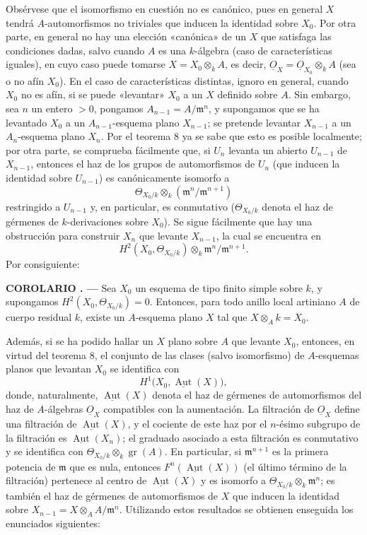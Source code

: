 \documentclass[11pt,twoside,openany]{book}
\numberwithin{equation}{section}
\newcommand{\Osh}{\underline{O}}
\theoremstyle{plain}
\theoremstyle{definition}
\theoremstyle{remark}
\newcommand{\result}[2]{%
  \par\medskip\noindent\textbf{#1%
  \if\relax\detokenize{#2}\relax\else\space#2\fi. ---}\enspace
}
\theoremstyle{plain}
\theoremstyle{definition}
\theoremstyle{remark}
\begin{document}
Obsérvese que el isomorfismo en cuestión no es canónico, pues en general $X$
tendrá $A$-automorfismos no triviales que inducen la identidad sobre $X_0$. Por
otra parte, en general no hay una elección «canónica» de un $X$ que satisfaga
las condiciones dadas, salvo cuando $A$ es una $k$-álgebra (caso de
características iguales), en cuyo caso puede tomarse $X=X_0\otimes_k A$, es
decir, $\Osh_X=\Osh_{X_0}\otimes_k A$ (sea o no afín $X_0$). En el caso de
características distintas, ignoro en general, cuando $X_0$ no es afín, si se
puede «levantar» $X_0$ a un $X$ definido sobre $A$. Sin embargo, sea $n$ un
entero $>0$, pongamos $A_{n-1}=A/\mathfrak m^n$, y supongamos que se ha
levantado $X_0$ a un $A_{n-1}$-esquema plano $X_{n-1}$; se pretende levantar
$X_{n-1}$ a un $A_n$-esquema plano $X_n$. Por el teorema 8 ya se sabe que esto
es posible localmente; por otra parte, se comprueba fácilmente que, si $U_n$
levanta un abierto $U_{n-1}$ de $X_{n-1}$, entonces el haz de los grupos de
automorfismos de $U_n$ (que inducen la identidad sobre $U_{n-1}$) es
canónicamente isomorfo a
\[
  \Theta_{X_0/k}\otimes_k(\mathfrak m^n/\mathfrak m^{n+1})
\]
restringido a $U_{n-1}$ y, en particular, es conmutativo
($\Theta_{X_0/k}$ denota el haz de gérmenes de $k$-derivaciones sobre $X_0$).
Se sigue fácilmente que hay una obstrucción para construir $X_n$ que levante
$X_{n-1}$, la cual se encuentra en
\[
  H^2(X_0,\Theta_{X_0/k})\otimes_k
  \mathfrak m^n/\mathfrak m^{n+1}.
\]
Por consiguiente:

\result{COROLARIO}{1} Sea $X_0$ un esquema de tipo finito simple sobre $k$, y
supongamos $H^2(X_0,\Theta_{X_0/k})=0$. Entonces, para todo anillo local
artiniano $A$ de cuerpo residual $k$, existe un $A$-esquema plano $X$ tal que
$X\otimes_A k=X_0$.

Además, si se ha podido hallar un $X$ plano sobre $A$ que levante $X_0$,
entonces, en virtud del teorema 8, el conjunto de las clases (salvo isomorfismo)
de $A$-esquemas planos que levantan $X_0$ se identifica con
\[
  H^1\bigl(X_0,\underline{\operatorname{Aut}}(X)\bigr),
\]
donde, naturalmente, $\underline{\operatorname{Aut}}(X)$ denota el haz de
gérmenes de automorfismos del haz de $A$-álgebras $\Osh_X$ compatibles con la
aumentación. La filtración de $\Osh_X$ define una filtración de
$\underline{\operatorname{Aut}}(X)$, y el cociente de este haz por el $n$-ésimo
subgrupo de la filtración es $\underline{\operatorname{Aut}}(X_n)$; el graduado
asociado a esta filtración es conmutativo y se identifica con
$\Theta_{X_0/k}\otimes_k\operatorname{gr}(A)$. En particular, si
$\mathfrak m^{n+1}$ es la primera potencia de $\mathfrak m$ que es nula,
entonces $F^n(\underline{\operatorname{Aut}}(X))$ (el último término de la
filtración) pertenece al centro de $\underline{\operatorname{Aut}}(X)$ y es
isomorfo a $\Theta_{X_0/k}\otimes_k\mathfrak m^n$; es también el haz de
gérmenes de automorfismos de $X$ que inducen la identidad sobre
$X_{n-1}=X\otimes_A A/\mathfrak m^n$. Utilizando estos resultados se obtienen
enseguida los enunciados siguientes:
\end{document}
